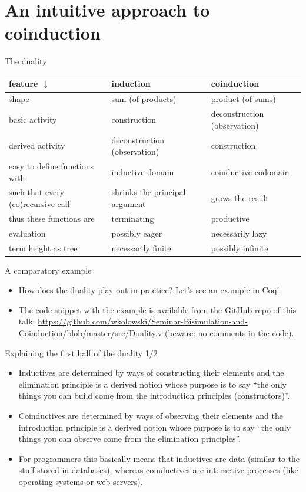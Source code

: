 \documentclass{beamer}
\begin{document}
\section{An intuitive approach to coinduction}

\begin{frame}{The duality}
\begin{tabular}{ | p{3cm} | p{3cm} | p{3cm} | }
	\hline
	feature $\downarrow$ & induction & coinduction \\\hline
	shape & sum (of products) & product (of sums) \\\hline
	basic activity & construction & deconstruction (observation) \\\hline
	derived activity & deconstruction (observation) & construction \\\hline
	easy to define functions with & inductive domain & coinductive codomain \\\hline
	such that every (co)recursive call & shrinks the principal argument & grows the result \\\hline
	thus these functions are & terminating & productive \\\hline
	evaluation & possibly eager & necessarily lazy \\\hline
	term height as tree & necessarily finite & possibly infinite \\\hline
\end{tabular}
\end{frame}

\begin{frame}{A comparatory example}
\begin{itemize}
	\item How does the duality play out in practice? Let's see an example in Coq!
	\item The code snippet with the example is available from the GitHub repo of this talk: \url{https://github.com/wkolowski/Seminar-Bisimulation-and-Coinduction/blob/master/src/Duality.v} (beware: no comments in the code).
\end{itemize}
\end{frame}

\begin{frame}{Explaining the first half of the duality 1/2}
\begin{itemize}
	\item Inductives are determined by ways of constructing their elements and the elimination principle is a derived notion whose purpose is to say ``the only things you can build come from the introduction principles (constructors)''.
	\item Coinductives are determined by ways of observing their elements and the introduction principle is a derived notion whose purpose is to say ``the only things you can observe come from the elimination principles''.
	\item For programmers this basically means that inductives are data (similar to the stuff stored in databases), whereas coinductives are interactive processes (like operating systems or web servers).
\end{itemize}
\end{frame}
\end{document}
